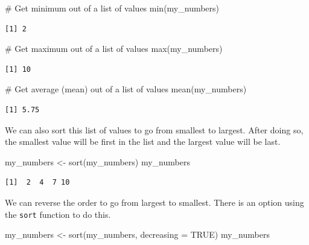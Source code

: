 \documentclass[
  letterpaper,
  DIV=11,
  numbers=noendperiod]{scrreprt}
\newenvironment{Shaded}{\begin{snugshade}}{\end{snugshade}}
\newcommand{\AttributeTok}[1]{\textcolor[rgb]{0.40,0.45,0.13}{#1}}
\newcommand{\CommentTok}[1]{\textcolor[rgb]{0.37,0.37,0.37}{#1}}
\newcommand{\ConstantTok}[1]{\textcolor[rgb]{0.56,0.35,0.01}{#1}}
\newcommand{\FunctionTok}[1]{\textcolor[rgb]{0.28,0.35,0.67}{#1}}
\newcommand{\NormalTok}[1]{\textcolor[rgb]{0.00,0.23,0.31}{#1}}
\newcommand{\OtherTok}[1]{\textcolor[rgb]{0.00,0.23,0.31}{#1}}
\begin{document}
\begin{Shaded}
\begin{Highlighting}[]
\CommentTok{\# Get minimum out of a list of values}
\FunctionTok{min}\NormalTok{(my\_numbers)}
\end{Highlighting}
\end{Shaded}

\begin{verbatim}
[1] 2
\end{verbatim}

\begin{Shaded}
\begin{Highlighting}[]
\CommentTok{\# Get maximum out of a list of values}
\FunctionTok{max}\NormalTok{(my\_numbers)}
\end{Highlighting}
\end{Shaded}

\begin{verbatim}
[1] 10
\end{verbatim}

\begin{Shaded}
\begin{Highlighting}[]
\CommentTok{\# Get average (mean) out of a list of values}
\FunctionTok{mean}\NormalTok{(my\_numbers)}
\end{Highlighting}
\end{Shaded}

\begin{verbatim}
[1] 5.75
\end{verbatim}

We can also sort this list of values to go from smallest to largest.
After doing so, the smallest value will be first in the list and the
largest value will be last.

\begin{Shaded}
\begin{Highlighting}[]
\NormalTok{my\_numbers }\OtherTok{\textless{}{-}} \FunctionTok{sort}\NormalTok{(my\_numbers)}
\NormalTok{my\_numbers}
\end{Highlighting}
\end{Shaded}

\begin{verbatim}
[1]  2  4  7 10
\end{verbatim}

We can reverse the order to go from largest to smallest. There is an
option using the \texttt{sort} function to do this.

\begin{Shaded}
\begin{Highlighting}[]
\NormalTok{my\_numbers }\OtherTok{\textless{}{-}} \FunctionTok{sort}\NormalTok{(my\_numbers, }\AttributeTok{decreasing =} \ConstantTok{TRUE}\NormalTok{)}
\NormalTok{my\_numbers}
\end{Highlighting}
\end{Shaded}
\end{document}
